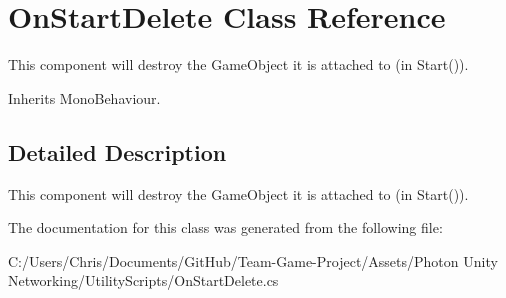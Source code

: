 \hypertarget{class_on_start_delete}{}\section{On\+Start\+Delete Class Reference}
\label{class_on_start_delete}


This component will destroy the Game\+Object it is attached to (in Start()). 




Inherits Mono\+Behaviour.



\subsection{Detailed Description}
This component will destroy the Game\+Object it is attached to (in Start()).



The documentation for this class was generated from the following file\+:\begin{DoxyCompactItemize}
\item 
C\+:/\+Users/\+Chris/\+Documents/\+Git\+Hub/\+Team-\/\+Game-\/\+Project/\+Assets/\+Photon Unity Networking/\+Utility\+Scripts/On\+Start\+Delete.\+cs\end{DoxyCompactItemize}
